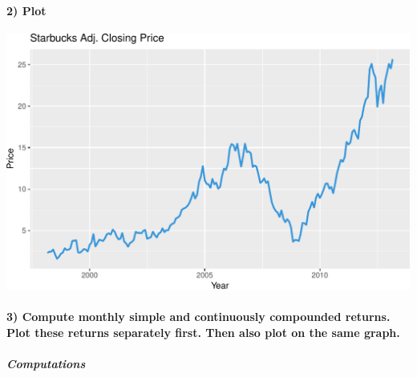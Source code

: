 \documentclass[]{article}
\newenvironment{Shaded}{\begin{snugshade}}{\end{snugshade}}
\newcommand{\KeywordTok}[1]{\textcolor[rgb]{0.13,0.29,0.53}{\textbf{#1}}}
\newcommand{\DataTypeTok}[1]{\textcolor[rgb]{0.13,0.29,0.53}{#1}}
\newcommand{\DecValTok}[1]{\textcolor[rgb]{0.00,0.00,0.81}{#1}}
\newcommand{\StringTok}[1]{\textcolor[rgb]{0.31,0.60,0.02}{#1}}
\newcommand{\OperatorTok}[1]{\textcolor[rgb]{0.81,0.36,0.00}{\textbf{#1}}}
\newcommand{\NormalTok}[1]{#1}
\let\oldparagraph\paragraph
\renewcommand{\paragraph}[1]{\oldparagraph{#1}\mbox{}}
\let\oldsubparagraph\subparagraph
\renewcommand{\subparagraph}[1]{\oldsubparagraph{#1}\mbox{}}
\begin{document}
\paragraph{2) Plot}\label{plot}

\begin{Shaded}
\end{Shaded}

\includegraphics{homework_1_markdown_files/figure-latex/unnamed-chunk-13-1.pdf}

\paragraph{3) Compute monthly simple and continuously compounded
returns. Plot these returns separately first. Then also plot on the same
graph.}\label{compute-monthly-simple-and-continuously-compounded-returns.-plot-these-returns-separately-first.-then-also-plot-on-the-same-graph.}

\subparagraph{Computations}\label{computations}
\end{document}
